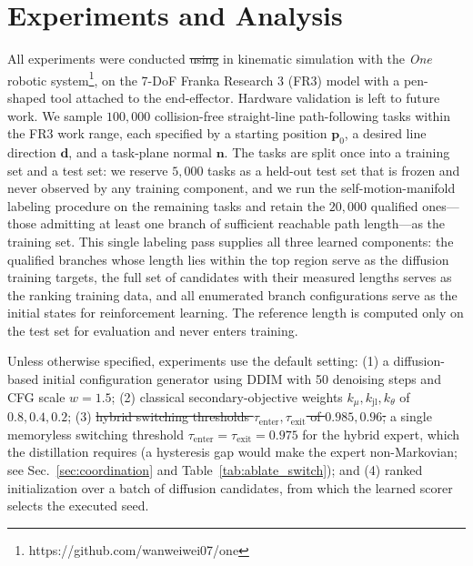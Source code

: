 \documentclass[journal, twoside]{IEEEtran}
\newcommand{\rev}[1]{\begingroup\color{magenta}#1\endgroup}
\newcommand{\rst}[1]{{\color{rstcolor}#1}}
\begin{document}
\section{Experiments and Analysis}
\rev{\label{sec:exp}}
All experiments were conducted \sout{using} \rst{in kinematic simulation with} the \textit{One} robotic system\footnote{https://github.com/wanweiwei07/one}, on the 7-DoF Franka Research 3 (FR3) \rst{model} with a pen-shaped tool attached to the end-effector. \rst{Hardware validation is left to future work.} \rev{We sample $100{,}000$ collision-free straight-line path-following tasks within the FR3 work range, each specified by a starting position $\mathbf{p}_0$, a desired line direction $\mathbf{d}$, and a task-plane normal $\mathbf{n}$. The tasks are split once into a training set and a test set: we reserve $5{,}000$ tasks as a held-out test set that is frozen and never observed by any training component, and we run the self-motion-manifold labeling procedure on the remaining tasks and retain the $20{,}000$ qualified ones---those admitting at least one branch of sufficient reachable path length---as the training set. This single labeling pass supplies all three learned components: the qualified branches whose length lies within the top region serve as the diffusion training targets, the full set of candidates with their measured lengths serves as the ranking training data, and all enumerated branch configurations serve as the initial states for reinforcement learning. The reference length is computed only on the test set for evaluation and never enters training.}

Unless otherwise specified, experiments use the default setting: \rev{(1)} a diffusion-based initial configuration generator using DDIM with 50 denoising steps and CFG scale $w=1.5$; \rev{(2)} classical secondary-objective weights $k_{\mu},k_{\mathrm{jl}},k_{\theta}$ of $0.8,0.4,0.2$; \rev{(3)} \sout{hybrid switching thresholds $\tau_{\mathrm{enter}},\tau_{\mathrm{exit}}$ of $0.985,0.96$;} \rst{a single memoryless switching threshold $\tau_{\mathrm{enter}}=\tau_{\mathrm{exit}}=0.975$ for the hybrid expert, which the distillation requires (a hysteresis gap would make the expert non-Markovian; see Sec.~\ref{sec:coordination} and Table~\ref{tab:ablate_switch});} \rev{and (4) ranked initialization over a batch of diffusion candidates, from which the learned scorer selects the executed seed}.
\end{document}
